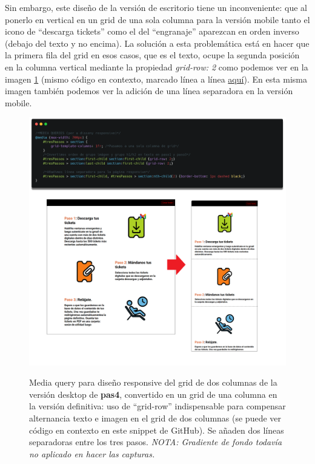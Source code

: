 \documentclass[a4paper,12pt]{report}
\begin{document}
	Sin embargo, este diseño de la versión de escritorio tiene un inconveniente: que al ponerlo en vertical en un grid de una sola columna para la versión mobile tanto el icono de ``descarga tickets'' como el del ``engranaje'' aparezcan en orden inverso (debajo del texto y no encima). La solución a esta problemática está en hacer que la primera fila del grid en esos casos, que es el texto, ocupe la segunda posición en la columna vertical mediante la propiedad \textit{grid-row: 2} como podemos ver en la imagen \ref{fig:pas4grid1col} (mismo código en contexto, marcado línea a línea \href{https://github.com/blackcub3s/mercApp/blob/75141ebaa42e677993ba88e1dfe73d417ef6386c/APP%20WEB/__frontend__produccio__/app/css/pas4/estilsEspecificsPas4.css#L57-L65}{aquí}). En esta misma imagen también podemos ver la adición de una línea separadora en la versión mobile.
	
	\FloatBarrier
	\setlength{\belowcaptionskip}{3pt}
	\begin{figure}[H]
		\centering
		\caption{Media query para diseño responsive del grid de dos columnas de la versión desktop de \textbf{pas4}, convertido en un grid de una columna en la versión definitiva: uso de ``grid-row'' indispensable para compensar alternancia texto e imagen en el grid de dos columnas (se puede ver código en contexto en este snippet de GitHub). Se añaden dos líneas separadoras entre los tres pasos. \textit{NOTA: Gradiente de fondo todavía no aplicado en hacer las capturas.}}
		\includegraphics[width=1\linewidth]{img/pas4grid1col}
		\label{fig:pas4grid1col}
	\end{figure}
	\FloatBarrier
	
\end{document}
